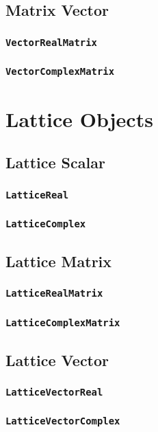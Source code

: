 \documentclass{article}
\begin{document}
\subsection{Matrix Vector}
\subsubsection*{\texttt{VectorRealMatrix}}
\subsubsection*{\texttt{VectorComplexMatrix}}

\section{Lattice Objects}

\subsection{Lattice Scalar}
\subsubsection*{\texttt{LatticeReal}}
\subsubsection*{\texttt{LatticeComplex}}

\subsection{Lattice Matrix}
\subsubsection*{\texttt{LatticeRealMatrix}}
\subsubsection*{\texttt{LatticeComplexMatrix}}

\subsection{Lattice Vector}
\subsubsection*{\texttt{LatticeVectorReal}}
\subsubsection*{\texttt{LatticeVectorComplex}}
\end{document}
